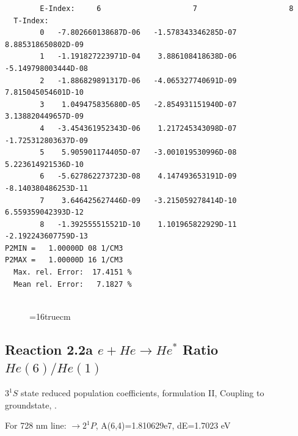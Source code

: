 \documentclass[12pt,dvipdfmx]{article}
\begin{document}
\begin{small}
\begin{verbatim}
        E-Index:     6                     7                     8
  T-Index:
        0   -7.802660138687D-06   -1.578343346285D-07    8.885318650802D-09
        1   -1.191827223971D-04    3.886108418638D-06   -5.149798003444D-08
        2   -1.886829891317D-06   -4.065327740691D-09    7.815045054601D-10
        3    1.049475835680D-05   -2.854931151940D-07    3.138820449657D-09
        4   -3.454361952343D-06    1.217245343098D-07   -1.725312803637D-09
        5    5.905901174405D-07   -3.001019530996D-08    5.223614921536D-10
        6   -5.627862273723D-08    4.147493653191D-09   -8.140380486253D-11
        7    3.646425627446D-09   -3.215059278414D-10    6.559359042393D-12
        8   -1.392555515521D-10    1.101965822929D-11   -2.192243607759D-13
P2MIN =   1.00000D 08 1/CM3
P2MAX =   1.00000D 16 1/CM3
  Max. rel. Error:  17.4151 %
  Mean rel. Error:   7.1827 %


\end{verbatim}\end{small}
\begin{figure} \label{2.1.8lr2o}
\epsfxsize=16truecm
\end{figure}
\newpage



\subsection{
  Reaction 2.2a $e + He \rightarrow He^*  $ Ratio $He(6)/He(1)$
}

  $3^1S$ state
  reduced population coefficients, formulation II,
  Coupling to groundstate, \cite{kn:Fujimoto}.

  For 728 nm line:  $\rightarrow 2^1P$, A(6,4)=1.810629e7, dE=1.7023 eV
\end{document}
